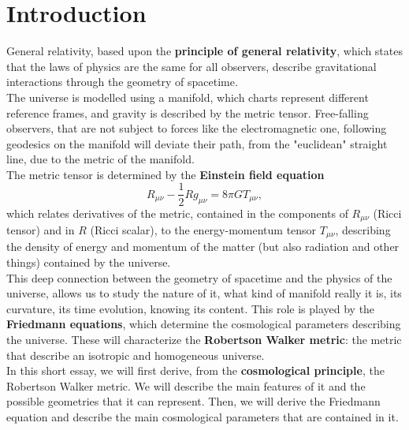 \section{Introduction}
General relativity, based upon the \textbf{principle of general relativity}, which states that the laws of physics are the same for all observers, describe gravitational interactions through the geometry of spacetime. 
\\ The universe is modelled using a manifold, which charts represent different reference frames, and gravity is described by the metric tensor. Free-falling observers, that are not subject to forces like the electromagnetic one, following geodesics on the manifold will deviate their path, from the "euclidean" straight line, due to the metric of the manifold.\\ The metric tensor is determined by the \textbf{Einstein field equation} $$R_{\mu\nu}-\frac{1}{2}Rg_{\mu\nu}=8\pi GT_{\mu\nu},$$
which relates derivatives of the metric, contained in the components of $R_{\mu\nu}$ (Ricci tensor) and in $R$ (Ricci scalar), to the energy-momentum tensor $T_{\mu\nu}$, describing the density of energy and momentum of the matter (but also radiation and other things) contained by the universe.\\

This deep connection between the geometry of spacetime and the physics of the universe, allows us to study the nature of it, what kind of manifold really it is, its curvature, its time evolution, knowing its content. This role is played by the \textbf{Friedmann equations}, which determine the cosmological parameters describing the universe. These will characterize the \textbf{Robertson Walker metric}: the metric that describe an isotropic and homogeneous universe. \\

In this short essay, we will first derive, from the \textbf{cosmological principle}, the Robertson Walker metric. We will describe the main features of it and the possible geometries that it can represent. Then, we will derive the Friedmann equation and describe the main cosmological parameters that are contained in it.